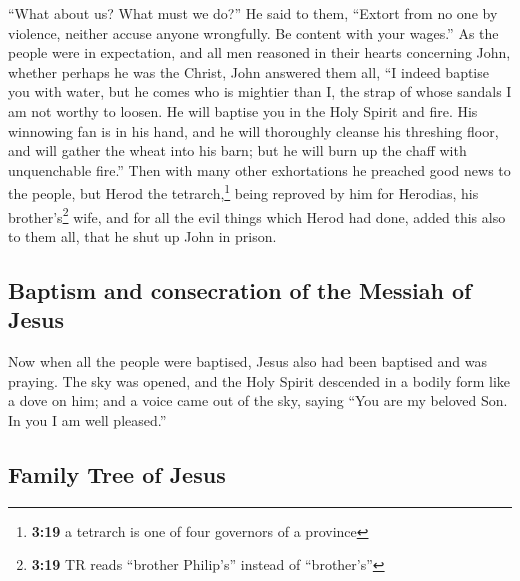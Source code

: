 ``What about us? What must we do?'' He said to them, ``Extort from no
one by violence, neither accuse anyone wrongfully. Be content with your
wages.''  As the people were in expectation, and all men
reasoned in their hearts concerning John, whether perhaps he was the
Christ,  John answered them all, ``I indeed baptise you
with water, but he comes who is mightier than I, the strap of whose
sandals I am not worthy to loosen. He will baptise you in the Holy
Spirit and fire.  His winnowing fan is in his hand, and
he will thoroughly cleanse his threshing floor, and will gather the
wheat into his barn; but he will burn up the chaff with unquenchable
fire.''  Then with many other exhortations he preached
good news to the people,  but Herod the
tetrarch,\footnote{\textbf{3:19} a tetrarch is one of four governors of
  a province} being reproved by him for Herodias, his
brother's\footnote{\textbf{3:19} TR reads ``brother Philip's'' instead
  of ``brother's''} wife, and for all the evil things which Herod had
done,  added this also to them all, that he shut up John
in prison.

\hypertarget{baptism-and-consecration-of-the-messiah-of-jesus}{%
\subsection{Baptism and consecration of the Messiah of
Jesus}\label{baptism-and-consecration-of-the-messiah-of-jesus}}

 Now when all the people were baptised, Jesus also had
been baptised and was praying. The sky was opened,  and
the Holy Spirit descended in a bodily form like a dove on him; and a
voice came out of the sky, saying ``You are my beloved Son. In you I am
well pleased.''

\hypertarget{family-tree-of-jesus}{%
\subsection{Family Tree of Jesus}\label{family-tree-of-jesus}}

